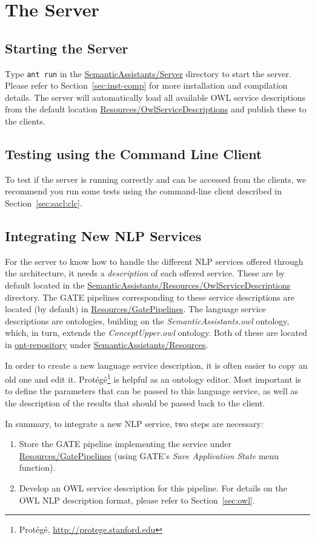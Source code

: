 \chapter{The \sa Server} 

\section{Starting the Server}
Type \texttt{ant run} in the \url{SemanticAssistants/Server} directory
to start the server. Please refer to Section~\ref{sec:inst-comp} for
more installation and compilation details. The server will
automatically load all available OWL service descriptions from the
default location \url{Resources/OwlServiceDescriptions} and publish
these to the clients.


\section{Testing using the Command Line Client}
To test if the server is running correctly and can be accessed from
the clients, we recommend you run some tests using the command-line
client described in Section~\ref{sec:sacl:clc}.


\section{Integrating New NLP Services}\label{sec:nlpservices}
For the server to know how to handle the different NLP services
offered through the architecture, it needs a \emph{description} of
each offered service. These are by default located in the
\url{SemanticAssistants/Resources/OwlServiceDescriptions}
directory. The GATE pipelines corresponding to these service
descriptions are located (by default) in
\url{Resources/GatePipelines}. The language service descriptions are
ontologies, building on the \emph{SemanticAssistants.owl} ontology,
which, in turn, extends the \emph{ConceptUpper.owl} ontology. Both of
these are located in \url{ont-repository} under
\url{SemanticAssistants/Resources}.

In order to create a new language service description, it is often
easier to copy an old one and edit
it. Prot\'{e}g\'{e}\footnote{Prot\'{e}g\'{e},
  \url{http://protege.stanford.edu}} is helpful as an ontology
editor. Most important is to define the parameters that can be passed
to this language service, as well as the description of the results
that should be passed back to the client.



In summary, to integrate a new NLP service, two steps are necessary:
\begin{enumerate}
\item Store the GATE pipeline implementing the service under
  \url{Resources/GatePipelines} (using GATE's \emph{Save Application State}
  menu function).
\item Develop an OWL service description for this pipeline.  For
  details on the OWL NLP description format, please refer to
  Section~\ref{sec:owl}.
\end{enumerate}

